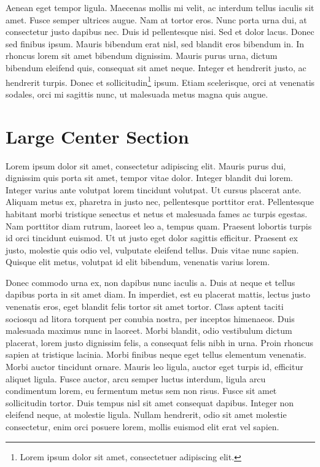 \documentclass[12pt]{article}
\begin{document}
Aenean eget tempor ligula. Maecenas mollis mi velit, ac interdum tellus iaculis sit amet. Fusce semper ultrices augue. Nam at tortor eros. Nunc porta urna dui, at consectetur justo dapibus nec. Duis id pellentesque nisi. Sed et dolor lacus. Donec sed finibus ipsum. Mauris bibendum erat nisl, sed blandit eros bibendum in. In rhoncus lorem sit amet bibendum dignissim. Mauris purus urna, dictum bibendum eleifend quis, consequat sit amet neque. Integer et hendrerit justo, ac hendrerit turpis. Donec et sollicitudin\footnote{Lorem ipsum dolor sit amet, consectetuer adipiscing elit.} ipsum. Etiam scelerisque, orci at venenatis sodales, orci mi sagittis nunc, ut malesuada metus magna quis augue. 

\section*{Large Center Section}

Lorem ipsum dolor sit amet, consectetur adipiscing elit. Mauris purus dui, dignissim quis porta sit amet, tempor vitae dolor. Integer blandit dui lorem. Integer varius ante volutpat lorem tincidunt volutpat. Ut cursus placerat ante. Aliquam metus ex, pharetra in justo nec, pellentesque porttitor erat. Pellentesque habitant morbi tristique senectus et netus et malesuada fames ac turpis egestas. Nam porttitor diam rutrum, laoreet leo a, tempus quam. Praesent lobortis turpis id orci tincidunt euismod. Ut ut justo eget dolor sagittis efficitur. Praesent ex justo, molestie quis odio vel, vulputate eleifend tellus. Duis vitae nunc sapien. Quisque elit metus, volutpat id elit bibendum, venenatis varius lorem.

Donec commodo urna ex, non dapibus nunc iaculis a. Duis at neque et tellus dapibus porta in sit amet diam. In imperdiet, est eu placerat mattis, lectus justo venenatis eros, eget blandit felis tortor sit amet tortor. Class aptent taciti sociosqu ad litora torquent per conubia nostra, per inceptos himenaeos. Duis malesuada maximus nunc in laoreet. Morbi blandit, odio vestibulum dictum placerat, lorem justo dignissim felis, a consequat felis nibh in urna. Proin rhoncus sapien at tristique lacinia. Morbi finibus neque eget tellus elementum venenatis. Morbi auctor tincidunt ornare. Mauris leo ligula, auctor eget turpis id, efficitur aliquet ligula. Fusce auctor, arcu semper luctus interdum, ligula arcu condimentum lorem, eu fermentum metus sem non risus. Fusce sit amet sollicitudin tortor. Duis tempus nisl sit amet consequat dapibus. Integer non eleifend neque, at molestie ligula. Nullam hendrerit, odio sit amet molestie consectetur, enim orci posuere lorem, mollis euismod elit erat vel sapien.
\end{document}
